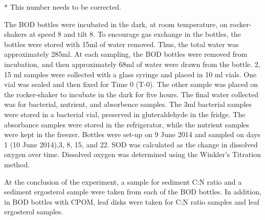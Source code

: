 * This number needs to be corrected.

The BOD bottles were incubated in the dark, at room temperature, on rocker-shakers at speed 8 and tilt 8. To encourage gas exchange in the bottles, the bottles were stored with 15ml of water removed. Thus, the total water was approximately 285ml. At each sampling, the BOD bottles were removed from incubation, and then approximately 68ml of water were drawn from the bottle. 2, 15 ml samples were collected with a glass syringe and placed in 10 ml vials. One vial was sealed and then fixed for Time 0 (T-0). The other sample was placed on the rocker-shaker to incubate in the dark for five hours. The final water collected was for bacterial, nutrient, and absorbence samples. The 3ml  bacterial samples were stored in a bacterial vial, preserved in gluteraldehyde in the fridge. The absorbance samples were stored in the refrigerator, while the nutrient samples were kept in the freezer. Bottles were set-up on 9 June 2014 and sampled on days 1 (10 June 2014),3, 8, 15, and 22. SOD was calculated as the change in dissolved oxygen over time. Dissolved oxygen was determined using the Winkler's Titration method. 

At the conclusion of the experiment, a sample for sediment C:N ratio and a sediment ergosterol sample were taken from each of the BOD bottles. In addition, in BOD bottles with CPOM, leaf disks were taken for C:N ratio samples and leaf ergosterol samples. 
